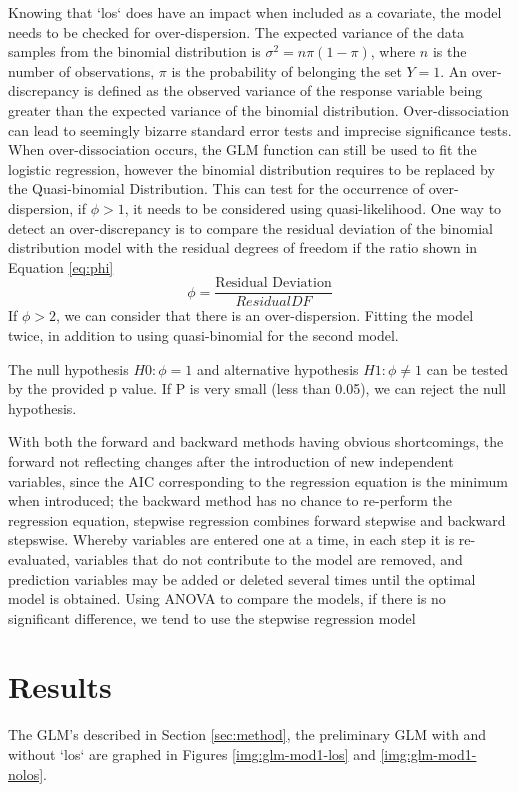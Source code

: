 \documentclass[11pt]{article}
\begin{document}
Knowing that `los` does have an impact when included as a covariate, the model needs to be checked for over-dispersion. The expected variance of the data samples from the binomial distribution is $\sigma^{2}=n\pi(1-\pi)$, where $n$ is the number of observations, $\pi$ is the probability of belonging the set $Y=1$. An over-discrepancy is defined as the observed variance of the response variable being greater than the expected variance of the binomial distribution. Over-dissociation can lead to seemingly bizarre standard error tests and imprecise significance tests. When over-dissociation occurs, the GLM function can still be used to fit the logistic regression, however the binomial distribution requires to be replaced by the Quasi-binomial Distribution. This can test for the occurrence of over-dispersion, if $\phi > 1$, it needs to be considered using quasi-likelihood. One way to detect an over-discrepancy is to compare the residual deviation of the binomial distribution model with the residual degrees of freedom if the ratio shown in Equation \ref{eq:phi}
\begin{equation}\label{eq:phi}
    \phi = \frac{\text{Residual Deviation}}{Residual DF}
\end{equation}
If $\phi > 2$, we can consider that there is an over-dispersion. Fitting the model twice, in addition to using quasi-binomial for the second model. 

The null hypothesis $H0: \phi = 1$ and alternative hypothesis $H1: \phi \ne 1$ can be tested by the provided p value. If P is very small (less than 0.05), we can reject the null hypothesis.

With both the forward and backward methods having obvious shortcomings, the forward not reflecting changes after the introduction of new independent variables, since the AIC corresponding to the regression equation is the minimum when introduced; the backward method has no chance to re-perform the regression equation, stepwise regression combines forward stepwise and backward stepswise. Whereby variables are entered one at a time, in each step it is re-evaluated, variables that do not contribute to the model are removed, and prediction variables may be added or deleted several times until the optimal model is obtained. Using ANOVA to compare the models, if there is no significant difference, we tend to use the stepwise regression model



\section{Results}\label{sec:results}
The GLM's described in Section \ref{sec:method}, the preliminary GLM with and without `los` are graphed in Figures \ref{img:glm-mod1-los} and \ref{img:glm-mod1-nolos}.
\end{document}
